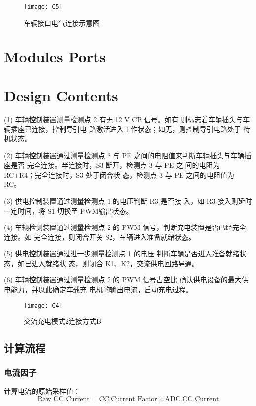 \begin{figure}[!htbp]
    \centering
    \texttt{[image: C5]}
    \caption{车辆接口电气连接示意图}
    \label{fig:C5}
\end{figure}

\section{Modules Ports}


\section{Design Contents}

(1) 车辆控制装置测量检测点 2 有无 12 V CP 信号。如有
则标志着车辆插头与车辆插座已连接，控制导引电
路激活进入工作状态；如无，则控制导引电路处于
待机状态。%

(2) 车辆控制装置通过测量检测点 3 与
PE 之间的电阻值来判断车辆插头与车辆插座是否
完全连接。半连接时，S3 断开，检测点 3 与 PE 之
间的电阻为 RC+R4；完全连接时，S3 处于闭合状
态，检测点 3 与 PE 之间的电阻值为 RC。

(3) 供电控制装置通过测量检测点 1 的电压判断 R3 是否接
入，如 R3 接入则延时一定时间，将 S1 切换至 PWM输出状态。

(4) 车辆检测装置通过测量检测点 2 的
PWM 信号，判断充电装置是否已经完全连接。如
完全连接，则闭合开关 S2，车辆进入准备就绪状态。

(5) 供电控制装置通过进一步测量检测点 1 的电压
判断车辆是否进入准备就绪状态，如已进入就绪状
态，则闭合 K1、K2，交流供电回路导通。%

(6) 车辆控制装置通过测量检测点 2 的 PWM 信号占空比
确认供电设备的最大供电能力，并以此确定车载充
电机的输出电流，启动充电过程。%


\begin{figure}[!htbp]
    \centering
    \texttt{[image: C4]}
    \caption{交流充电模式2连接方式B}
    \label{fig:C3}
\end{figure}



\subsection{计算流程}
\subsubsection*{电流因子}
        计算电流的原始采样值：
            \begin{equation}
                \mathrm{Raw\_CC\_Current} = \mathrm{CC\_Current\_Factor} \times  \mathrm{ADC\_CC\_Current}
                \label{eq:CC1}
            \end{equation}

